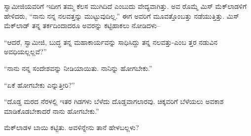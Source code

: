 ಸ್ವಾಮೀಜಿಯವರಿಗೆ ಇದೀಗ ತಮ್ಮ ಕೆಲಸ ಮುಗಿದಿದೆ ಎಂಬುದು ವೇದ್ಯವಾಗಿತ್ತು. ಅವ ರೊಮ್ಮೆ ಮಿಸ್ ಮೆಕ್​ಲಾಡಳಿಗೆ ಹೇಳಿದರು, “ನಾನು ನನ್ನ ನಲವತ್ತನ್ನು ಮುಟ್ಟುವುದಿಲ್ಲ.” ಈಗ ಅವರಿಗೆ ಮೂವತ್ತೊಂಬತ್ತು ನಡೆಯುತ್ತಿತ್ತು. ಮಿಸ್ ಮೆಕ್​ಲಾಡ್ ತನ್ನ ತರ್ಕದಿಂದಾದರೂ ಅವರನ್ನು ಕಟ್ಟಿಹಾಕಲು ನೋಡಿದಳು–

“ಆದರೆ, ಸ್ವಾಮೀಜಿ, ಬುದ್ಧ ತನ್ನ ಮಹಾಕಾರ್ಯವನ್ನು ಸಾಧಿಸಿದ್ದು ತನ್ನ ನಲವತ್ತು-ಎಂಬ ತ್ತರ ನಡುವಿನ ಅವಧಿಯಲ್ಲಲ್ಲವೆ?”

“ನಾನು ನನ್ನ ಸಂದೇಶವನ್ನು ನೀಡಿಯಾಯಿತು. ನಾನಿನ್ನು ಹೋಗಬೇಕು.”

“ಏಕೆ ಹೋಗಬೇಕು ಎನ್ನುತ್ತೀರಿ?”

“ದೊಡ್ಡ ಮರದ ನೆರಳಲ್ಲಿ ಇತರ ಗಿಡಗಳು ಬೆಳೆದು ದೊಡ್ಡವಾಗಲಾರವು. ಚಿಕ್ಕವರಿಗೆ ಬೆಳೆಯಲು ಅವಕಾಶ ಮಾಡಿಕೊಡಬೇಕಾದರೆ ನಾನು ಹೋಗಬೇಕು.”

ಮೆಕ್​ಲಾಡಳ ಬಾಯಿ ಕಟ್ಟಿತು. ಅವಳಿನ್ನೇನು ತಾನೆ ಹೇಳಬಲ್ಲಳು?

